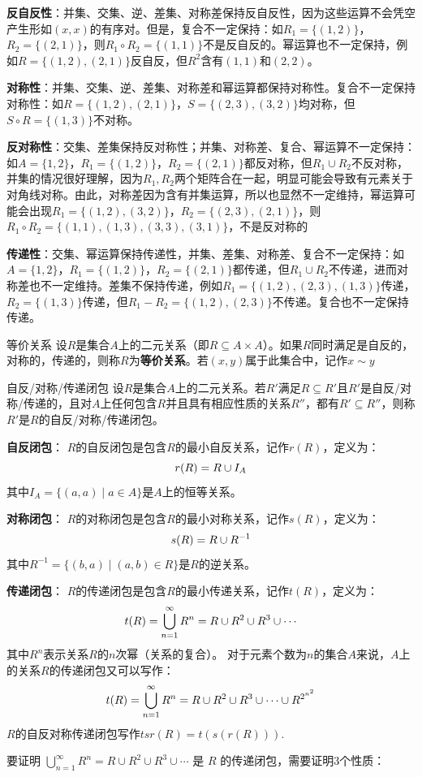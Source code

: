 \documentclass[lang=cn,11pt]{elegantbook}
\begin{document}
\textbf{反自反性}：并集、交集、逆、差集、对称差保持反自反性，因为这些运算不会凭空产生形如$(x,x)$的有序对。但是，复合不一定保持：如$R_1 = \{(1,2)\}$，$R_2 = \{(2,1)\}$，则$R_1 \circ R_2 = \{(1,1)\}$不是反自反的。幂运算也不一定保持，例如$R=\{(1,2),(2,1)\}$反自反，但$R^2$含有$(1,1)$和$(2,2)$。

\textbf{对称性}：并集、交集、逆、差集、对称差和幂运算都保持对称性。复合不一定保持对称性：如$R = \{(1,2),(2,1)\}$，$S=\{(2,3),(3,2)\}$均对称，但$S\circ R=\{(1,3)\}$不对称。

\textbf{反对称性}：交集、差集保持反对称性；并集、对称差、复合、幂运算不一定保持：如$A = \{1,2\}$，$R_1 = \{(1,2)\}$，$R_2 = \{(2,1)\}$都反对称，但$R_1 \cup R_2$不反对称，并集的情况很好理解，因为$R_1,R_2$两个矩阵合在一起，明显可能会导致有元素关于对角线对称。由此，对称差因为含有并集运算，所以也显然不一定维持，幂运算可能会出现$R_1 = \{(1,2),(3,2)\}$，$R_2 = \{(2,3),(2,1)\}$，则$R_1 \circ R_2 = \{(1,1),(1,3),(3,3),(3,1)\}$，不是反对称的

\textbf{传递性}：交集、幂运算保持传递性，并集、差集、对称差、复合不一定保持：如$A = \{1,2\}$，$R_1 = \{(1,2)\}$，$R_2 = \{(2,1)\}$都传递，但$R_1 \cup R_2$不传递，进而对称差也不一定维持。差集不保持传递，例如$R_1=\{(1,2),(2,3),(1,3)\}$传递，$R_2=\{(1,3)\}$传递，但$R_1-R_2=\{(1,2),(2,3)\}$不传递。复合也不一定保持传递。
\begin{definition}{等价关系}
设$R$是集合$A$上的二元关系（即$R \subseteq A \times A$）。如果$R$同时满足是自反的，对称的，传递的，则称$R$为\textbf{等价关系}。若$(x,y)$属于此集合中，记作$x\sim y$
\end{definition}
\begin{definition}{自反/对称/传递闭包}
    设$R$是集合$A$上的二元关系。若$R'$满足$R \subseteq R'$且$R'$是自反/对称/传递的，且对$A$上任何包含$R$并且具有相应性质的关系$R''$，都有$R'\subseteq R''$，则称$R'$是$R$的自反/对称/传递闭包。

\textbf{自反闭包}：
$R$的自反闭包是包含$R$的最小自反关系，记作$r(R)$，定义为：\vspace{-10pt}
$$r(R) = R \cup I_A\vspace{-10pt}$$
其中$I_A = \{(a,a) \mid a \in A\}$是$A$上的恒等关系。

\textbf{对称闭包}：
$R$的对称闭包是包含$R$的最小对称关系，记作$s(R)$，定义为：\vspace{-10pt}
$$s(R) = R \cup R^{-1}\vspace{-10pt}$$
其中$R^{-1} = \{(b,a) \mid (a,b) \in R\}$是$R$的逆关系。

\textbf{传递闭包}：
$R$的传递闭包是包含$R$的最小传递关系，记作$t(R)$，定义为：\vspace{-10pt}
$$t(R) = \bigcup_{n=1}^{\infty} R^n = R \cup R^2 \cup R^3 \cup \cdots\vspace{-10pt}$$
其中$R^n$表示关系$R$的$n$次幂（关系的复合）。 对于元素个数为$n$的集合$A$来说，$A$上的关系$R$的传递闭包又可以写作：
\vspace{-10pt}
$$t(R) = \bigcup_{n=1}^{\infty} R^n = R \cup R^2 \cup R^3 \cup \cdots\cup R^{2^{n^2}}\vspace{-10pt}$$
$R$的自反对称传递闭包写作$tsr(R)=t(s(r(R)))$.
\end{definition}
要证明 $\bigcup_{n=1}^{\infty} R^n = R \cup R^2 \cup R^3 \cup \cdots$ 是 $R$ 的传递闭包，需要证明3个性质：
\end{document}

